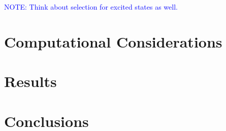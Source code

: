 \documentclass[aip,jcp,amsmath,amssymb, reprint]{revtex4-1}
\begin{document}

\textcolor{blue}{NOTE: Think about selection for excited states as well.}


\section{Computational Considerations}

\section{Results}

\section{Conclusions}


\end{document}
